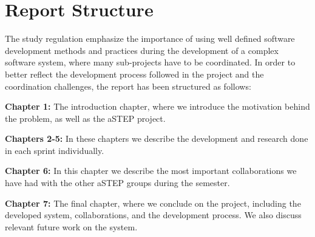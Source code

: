 \section{Report Structure} \label{sec:report_structure}
The study regulation emphasize the importance of using well defined software development methods and practices during the development of a complex software system, where many sub-projects have to be coordinated. In order to better reflect the development process followed in the project and the coordination challenges, the report has been structured as follows:

\textbf{Chapter 1:} The introduction chapter, where we introduce the motivation behind the problem, as well as the aSTEP project.

\textbf{Chapters 2-5:} In these chapters we describe the development and research done in each sprint individually.

\textbf{Chapter 6:} In this chapter we describe the most important collaborations we have had with the other aSTEP groups during the semester.

\textbf{Chapter 7:} The final chapter, where we conclude on the project, including the developed system, collaborations, and the development process. We also discuss relevant future work on the system.
